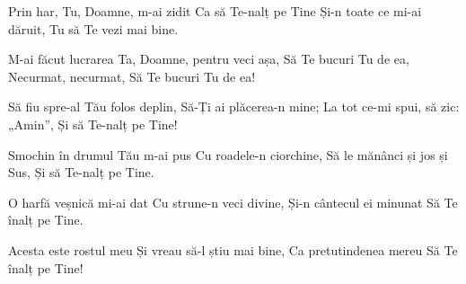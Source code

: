 \beginverse
Prin har, Tu, Doamne, m-ai zidit
Ca să Te-nalț pe Tine
Și-n toate ce mi-ai dăruit,
Tu să Te vezi mai bine.
\endverse

\beginchorus
M-ai făcut lucrarea Ta,
Doamne, pentru veci așa,
Să Te bucuri Tu de ea,
Necurmat, necurmat,
Să Te bucuri Tu de ea!
\endchorus

\beginverse
Să fiu spre-al Tău folos deplin,
Să-Ți ai plăcerea-n mine;
La tot ce-mi spui, să zic: „Amin”,
Și să Te-nalț pe Tine!
\endverse

\beginverse
Smochin în drumul Tău m-ai pus
Cu roadele-n ciorchine,
Să le mănânci și jos și Sus,
Și să Te-nalț pe Tine.
\endverse

\beginverse
O harfă veșnică mi-ai dat
Cu strune-n veci divine,
Și-n cântecul ei minunat
Să Te înalț pe Tine.
\endverse

\beginverse
Acesta este rostul meu
Și vreau să-l știu mai bine,
Ca pretutindenea mereu
Să Te înalț pe Tine!
\endverse
\endsong